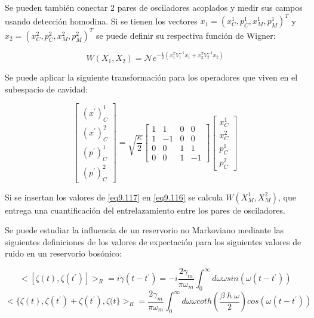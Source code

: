 \documentclass{book}
\begin{document}
Se pueden también conectar 2 pares de osciladores acoplados y medir sus campos usando detección homodina. Si se tienen los vectores $x_1=(x_C^1,p_C^1,x_M^1,p_M^1)^T$ y $x_2=(x_C^2,p_C^2,x_M^2,p_M^2)^T$ se puede definir su respectiva función de Wigner:

\begin{equation}\label{eq9.116}W(X_1,X_2)=\mathcal{N}e^{-\frac{1}{2}(x_1^TV_1^{-1}x_1+x_2^TV_2^{-1}x_2)}\end{equation}

Se puede aplicar la siguiente transformación para los operadores que viven en el subespacio de cavidad:

\begin{equation}\label{eq9.117}\begin{bmatrix} (x^\prime)^1_C\\(x^\prime)^2_C\\(p^\prime)^1_C\\(p^\prime)^2_C\end{bmatrix}=\sqrt{\frac{\kappa}{2}}\begin{bmatrix} 1&1&0&0\\1&-1&0&0\\0&0&1&1\\0&0&1&-1\end{bmatrix}\begin{bmatrix} x^1_C\\x^2_C\\p^1_C\\p^2_C\end{bmatrix}\end{equation}

Si se insertan los valores de \ref{eq9.117} en \ref{eq9.116} se calcula $W(X^1_M,X^2_M)$, que entrega una cuantificación del entrelazamiento entre los pares de osciladores.

Se puede estudiar la influencia de un reservorio no Markoviano mediante las siguientes definiciones de los valores de expectación para los siguientes valores de ruido en un reservorio bosónico:

\begin{equation}\label{eq9.118}<[\zeta(t),\zeta(t^\prime)]>_R=i\dot{\gamma}(t-t^\prime)=-i\frac{2\gamma_m}{\pi\omega_m}\int_0^\infty d\omega \omega sin(\omega(t-t^\prime))\end{equation}
\begin{equation}\label{eq9.119}<\{\zeta(t),\zeta(t^\prime)+\zeta(t^\prime),\zeta(t\}>_R=\frac{2\gamma_m}{\pi\omega_m}\int_0^\infty d\omega \omega coth(\frac{\beta\hslash\omega}{2})cos(\omega(t-t^\prime))\end{equation}
\end{document}
